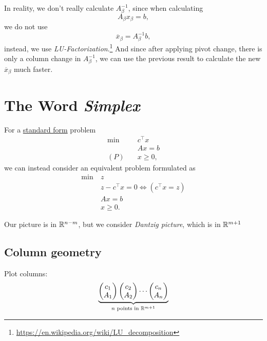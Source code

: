 \begin{note}
	In reality, we don't really calculate \(A^{-1}_{\beta}\), since when calculating
	\[
		A_{\beta}x_{\beta} = b,
	\]
	we do not use
	\[
		\overline{x}_{\beta} = A^{-1}_{\beta}b,
	\]
	instead, we use \emph{LU-Factorization}.\footnote{\url{https://en.wikipedia.org/wiki/LU_decomposition}} And since after applying pivot change,
	there is only a column change in \(A^{-1}_{\beta}\), we can use the previous result
	to calculate the new \(\overline{x}_{\beta}\) much faster.
\end{note}

\section{The Word \emph{Simplex}}
For a \hyperref[def:standard-form]{standard form} problem
\begin{align*}
	\min~    & c^{\top}x \\
	         & Ax = b    \\
	(P)\quad & x\geq 0,
\end{align*}
we can instead consider an equivalent problem formulated as
\begin{align*}
	\min~ & z                                        \\
	      & z - c^{\top} x = 0 \iff (c^{\top} x = z) \\
	      & Ax = b                                   \\
	      & x\geq 0.
\end{align*}

\begin{prev}
	Our picture is in \(\mathbb{\MakeUppercase{R}}^{n-m}\), but we consider \emph{Dantzig picture}, which is in \(\mathbb{\MakeUppercase{R}}^{m+1}\)
\end{prev}

\subsection{Column geometry}
Plot columns:
\[
	\underbrace{
		\begin{pmatrix}
			c_1 \\
			A_1 \\
		\end{pmatrix}
		\begin{pmatrix}
			c_2 \\
			A_2 \\
		\end{pmatrix}
		\cdots
		\begin{pmatrix}
			c_n \\
			A_n \\
		\end{pmatrix}}_{n \text{ points in }\mathbb{\MakeUppercase{R}}^{m+1}}
\]

